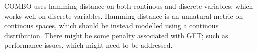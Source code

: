 \documentclass[
    american,a4paper
    ]{scrartcl}
\newcommand{\lang}{en}
\begin{document}
\begin{description}[style=unboxed]
            \item [\questionFour{\lang}]
                COMBO uses hamming distance on both continous and discrete variables; which works well on discrete variables.
                Hamming distance is an unnatural metric on continous spaces, which should be instead modelled using a continous distribution.
                There might be some penalty associated with GFT; such as performance issues, which might need to be addressed.
        \end{description}
        
        \sectionSource{\lang}
        \sectionSourceDescription{\lang}
\end{document}
